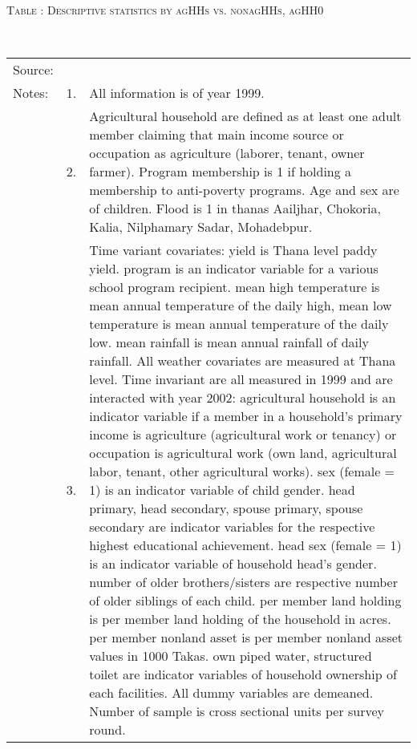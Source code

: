 \begin{minipage}[t]{14cm}
\hfil\textsc{\normalsize Table \thetable: Descriptive statistics by agHHs vs. nonagHHs, agHH0\label{tab destat zEm1999 by agHH0}}\\
\setlength{\tabcolsep}{1pt}
\renewcommand{\arraystretch}{.8}
\hfil{}\\
\renewcommand{\arraystretch}{.8}
\setlength{\tabcolsep}{1pt}
\begin{tabular}{>{\hfill\scriptsize}p{1cm}<{}>{\hfill\scriptsize}p{.25cm}<{}>{\scriptsize}p{12cm}<{\hfill}}
Source:& \multicolumn{2}{l}{\scriptsize Compiled from IFPRI data.}\\
Notes: & 1. & All information is of year 1999.\\
& 2. & Agricultural household are defined as at least one adult member claiming that main income source or occupation as agriculture (laborer, tenant, owner farmer). \textsf{Program} membership is 1 if holding a membership to anti-poverty programs. \textsf{Age} and \textsf{sex} are of children. \textsf{Flood} is 1 in thanas Aailjhar,  Chokoria, Kalia, Nilphamary Sadar, Mohadebpur. \\
& 3. & Time variant covariates: \textsf{yield} is Thana level paddy yield. \textsf{program} is an indicator variable for a various school program recipient. \textsf{mean high temperature} is mean annual temperature of the daily high, \textsf{mean low temperature} is mean annual temperature of the daily low. \textsf{mean rainfall} is mean annual rainfall of daily rainfall. All weather covariates are measured at Thana level. Time invariant are all measured in 1999 and are interacted with year 2002: \textsf{agricultural household} is an indicator variable if a member in a household's primary income is agriculture (agricultural work or tenancy) or occupation is agricultural work (own land, agricultural labor, tenant, other agricultural works). \textsf{sex (female = 1)} is an indicator variable of child gender. \textsf{head primary, head secondary, spouse primary, spouse secondary} are indicator variables for the respective highest educational achievement. \textsf{head sex (female = 1)} is an indicator variable of household head's gender. \textsf{number of older brothers/sisters} are respective number of older siblings of each child. \textsf{per member land holding} is per member land holding of the household in acres. \textsf{per member nonland asset} is per member nonland asset values in 1000 Takas. \textsf{own piped water, structured toilet} are indicator variables of household ownership of each facilities. All dummy variables are demeaned. Number of sample is cross sectional units per survey round. 
\end{tabular}
\end{minipage}\\ \vspace{2ex}
